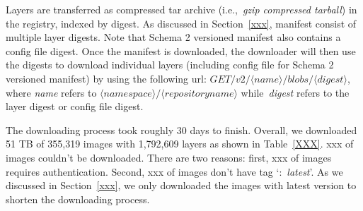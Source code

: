 %
Layers are transferred as compressed tar archive (i.e.,~\textit{gzip compressed tarball}) in the registry, indexed by digest.
%
%
As discussed in Section~\ref{xxx}, manifest consist of multiple layer digests.
%
Note that Schema 2 versioned manifest also contains a config file digest.
%
Once the manifest is downloaded, the downloader will then use the digests to download individual layers (including config file for Schema 2 versioned manifest) by using the following url: $GET /v2/\langle name \rangle/blobs/\langle digest \rangle$, where \textit{name} refers to $\langle namespace\rangle/\langle repository name \rangle$ while~\textit{digest} refers to the layer digest or config file digest.

%
%


The downloading process took roughly 30 days to finish.
%
Overall, we downloaded 51 TB of 355,319 images with 1,792,609 layers as shown in Table~\ref{XXX}.
%
xxx of images couldn't be downloaded.
%
There are two reasons: first, xxx of images requires authentication.
%
Second, xxx of images don't have tag `:~\textit{latest}'.
%
As we discussed in Section~\ref{xxx}, we only downloaded the images with latest version to shorten the downloading process.







